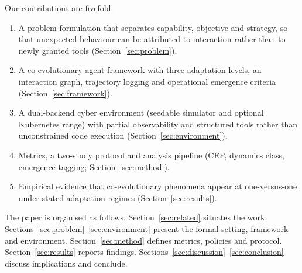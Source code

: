 Our contributions are fivefold.
\begin{enumerate}
\item A problem formulation that separates capability, objective and
strategy, so that unexpected behaviour can be attributed to interaction
rather than to newly granted tools (Section~\ref{sec:problem}).
\item A co-evolutionary agent framework with three adaptation levels,
an interaction graph, trajectory logging and operational emergence
criteria (Section~\ref{sec:framework}).
\item A dual-backend cyber environment (seedable simulator and optional
Kubernetes range) with partial observability and structured tools rather
than unconstrained code execution (Section~\ref{sec:environment}).
\item Metrics, a two-study protocol and analysis pipeline (CEP, dynamics
class, emergence tagging; Section~\ref{sec:method}).
\item Empirical evidence that co-evolutionary phenomena appear at one-versus-one
under stated adaptation regimes (Section~\ref{sec:results}).
\end{enumerate}

The paper is organised as follows. Section~\ref{sec:related} situates
the work. Sections~\ref{sec:problem}--\ref{sec:environment} present the
formal setting, framework and environment. Section~\ref{sec:method}
defines metrics, policies and protocol. Section~\ref{sec:results}
reports findings. Sections~\ref{sec:discussion}--\ref{sec:conclusion}
discuss implications and conclude.
